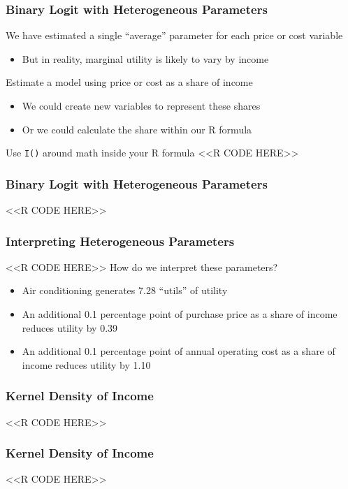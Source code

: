 \documentclass{beamer}
\begin{document}
\begin{frame}[fragile]\frametitle{Binary Logit with Heterogeneous Parameters}
    We have estimated a single ``average'' parameter for each price or cost variable
    \begin{itemize}
        \item But in reality, marginal utility is likely to vary by income
    \end{itemize}
    \vspace{2ex}
    Estimate a model using price or cost as a share of income
    \begin{itemize}
        \item We could create new variables to represent these shares
        \item Or we could calculate the share within our R formula
    \end{itemize}
    \vspace{2ex}
    Use \texttt{I()} around math inside your R formula
    <<R CODE HERE>>
\end{frame}

\begin{frame}[fragile]\frametitle{Binary Logit with Heterogeneous Parameters}
    <<R CODE HERE>>
\end{frame}

\begin{frame}[fragile]\frametitle{Interpreting Heterogeneous Parameters}
    <<R CODE HERE>>
    \vspace{2ex}
    How do we interpret these parameters?
    \begin{itemize}
        \item Air conditioning generates 7.28 ``utils'' of utility
        \item An additional 0.1 percentage point of purchase price as a share of income reduces utility by 0.39
        \item An additional 0.1 percentage point of annual operating cost as a share of income reduces utility by 1.10
    \end{itemize}
\end{frame}

\begin{frame}[fragile]\frametitle{Kernel Density of Income}
    <<R CODE HERE>>
\end{frame}

\begin{frame}[fragile]\frametitle{Kernel Density of Income}
    <<R CODE HERE>>
\end{frame}
\end{document}
